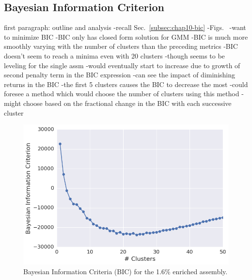 \subsection{Bayesian Information Criterion}
\label{subsec:chap11-bic}

first paragraph: outline and analysis
-recall Sec.~\ref{subsec:chap10-bic}
-Figs.~
-want to minimize BIC
-BIC only has closed form solution for \ac{GMM}
-BIC is much more smoothly varying with the number of clusters than the preceding metrics
-BIC doesn't seem to reach a minima even with 20 clusters
  -though seems to be leveling for the single assm
  -would eventually start to increase due to growth of second penalty term in the BIC expression
-can see the impact of diminishing returns in the BIC
  -the first 5 clusters causes the BIC to decrease the most
-could foresee a method which would choose the number of clusters using this method
  -might choose based on the fractional change in the BIC with each successive cluster

\begin{figure}[h!]
\centering
\includegraphics[width=0.87\linewidth]{figures/results/model-select/assm-16/bic-combined-U238-capture-1}
\vspace{2mm}
\caption[Silhouette coefficients for the 1.6\% enriched assembly]{Bayesian Information Criteria (BIC) for the 1.6\% enriched assembly.}
\label{fig:chap11-assm-16-bic}
\end{figure}

